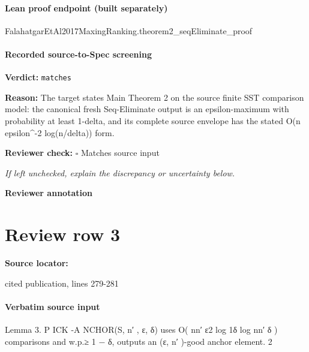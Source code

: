 \documentclass[10pt]{article}
\newcommand{\reviewerbox}{%
  \par\noindent\fbox{\parbox{0.96\linewidth}{\rule{0pt}{0.38in}}}\par
}
\newcommand{\reviewmatch}[1]{%
  \par\noindent\textbf{Reviewer check:} $\square$\; #1\par
  \noindent\emph{If left unchecked, explain the discrepancy or uncertainty below.}\par
}
\begin{document}
\paragraph{Lean proof endpoint (built separately)}\begin{ReviewVerbatim}
FalahatgarEtAl2017MaxingRanking.theorem2_seqEliminate_proof
\end{ReviewVerbatim}

\paragraph{Recorded source-to-Spec screening}
\textbf{Verdict:} \texttt{matches}
\\
{\raggedright
\textbf{Reason:} The target states Main Theorem 2 on the source finite SST comparison model:\allowbreak{} the canonical fresh Seq-\allowbreak{}Eliminate output is an epsilon-\allowbreak{}maximum with probability at least 1-\allowbreak{}delta, and its complete source envelope has the stated O(n epsilon\textasciicircum{}-\allowbreak{}2 log(n/\allowbreak{}delta)) form.\allowbreak{}
\par}
\reviewmatch{Matches source input}
\noindent\textbf{Reviewer annotation}\par
\reviewerbox
\clearpage
\hypertarget{source-claim-f1cc1dddf420ce6e}{}
\section*{Review row 3}
\textbf{Source locator:} {\footnotesize\raggedright cited publication, lines 279-\allowbreak{}281\par}
\paragraph{Verbatim source input}
\begin{ReviewVerbatim}
Lemma 3. P ICK -A NCHOR(S, n′ , ε, δ) uses O( nn′ ε2 log 1δ log nn′ δ ) comparisons and w.p.≥ 1 − δ,
outputs an (ε, n′ )-good anchor element.
                                                                            2
\end{ReviewVerbatim}
\end{document}
